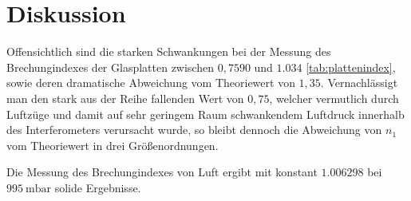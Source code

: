 \section{Diskussion}
Offensichtlich sind die starken Schwankungen bei der Messung des Brechungindexes der Glasplatten zwischen $0,7590$ und $1.034$ \ref{tab:plattenindex}, sowie deren dramatische Abweichung vom Theoriewert von $1,35$. Vernachlässigt man den stark aus der Reihe fallenden Wert von $0,75$, welcher vermutlich durch Luftzüge und damit auf sehr geringem Raum schwankendem Luftdruck innerhalb des Interferometers verursacht wurde, so bleibt dennoch die Abweichung von $n_1$ vom Theoriewert in drei Größenordnungen.

Die Messung des Brechungindexes von Luft ergibt mit konstant $1.006298$ bei $\SI{995}{\milli\bar}$ solide Ergebnisse.



